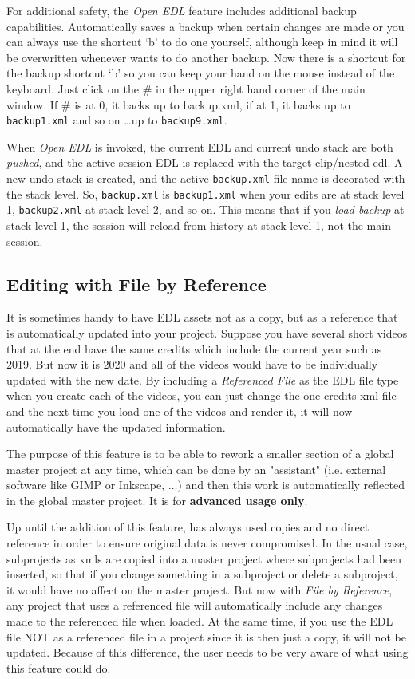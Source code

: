 For additional safety, the \textit{Open EDL} feature includes
additional backup capabilities. Automatically \CGG{} saves a backup
when certain changes are made or you can always use the shortcut `b'
to do one yourself, although keep in mind it will be overwritten
whenever \CGG{} wants to do another backup.  Now there is a shortcut
for the backup shortcut `b' so you can keep your hand on the mouse
instead of the keyboard.  Just click on the \# in the upper right
hand corner of the main window.  If \# is at 0, it backs up to
backup.xml, if at 1, it backs up to \texttt{backup1.xml} and so on
\dots up to \texttt{backup9.xml}.

When \textit{Open EDL} is invoked, the current EDL and current undo
stack are both \textit{pushed}, and the active session EDL is
replaced with the target clip/nested edl.  A new undo stack is
created, and the active \texttt{backup.xml} file name is decorated
with the stack level.  So, \texttt{backup.xml} is
\texttt{backup1.xml} when your edits are at stack level 1,
\texttt{back\-up2\-.xml} at stack level 2, and so on.  This means
that if you \textit{load backup} at stack level 1, the session will
reload from history at stack level 1, not the main session.


\subsection{Editing with File by Reference}%
\label{sub:file-reference}

It is sometimes handy to have EDL assets not as a copy, but as a
reference that is automatically updated into your project.  Suppose
you have several short videos that at the end have the same credits
which include the current year such as 2019.  But now it is 2020 and
all of the videos would have to be individually updated with the new
date.  By including a \textit{Referenced File} as the EDL file type
when you create each of the videos, you can just change the one
credits xml file and the next time you load one of the videos and
render it, it will now automatically have the updated information.

The purpose of this feature is to be able to rework a smaller
section of a global master project at any time, which can be done by
an "assistant" (i.e. external software like GIMP or Inkscape, $\dots$) and then this work is automatically reflected in the
global master project.  It is for \textbf{advanced usage only}.

Up until the addition of this feature, \CGG{} has always used copies
and no direct reference in order to ensure original data is never
compromised.  In the usual case, subprojects as xmls are copied into
a master project where subprojects had been inserted, so that if you
change something in a subproject or delete a subproject, it would
have no affect on the master project.  But now with \textit{File by
  Reference}, any project that uses a referenced file will
automatically include any changes made to the referenced file when
loaded.  At the same time, if you use the EDL file NOT as a
referenced file in a project since it is then just a copy, it will
not be updated.  Because of this difference, the user needs to be
very aware of what using this feature could do.

